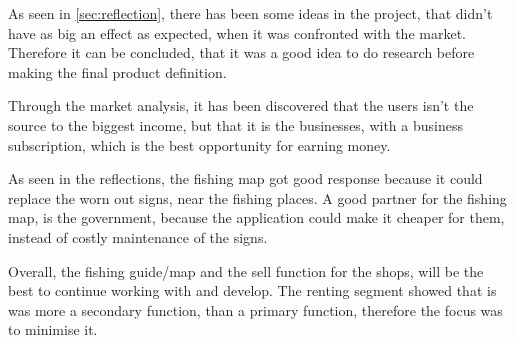 As seen in \autoref{sec:reflection}, there has been some ideas in the project, that didn't have as big an effect as expected, when it was confronted with the market. Therefore it can be concluded, that it was a good idea to do research before making the final product definition.   


Through the market analysis, it has been discovered that the users isn’t the source to the biggest income, but that it is the businesses, with a business subscription, which is the best opportunity for earning money. 


As seen in the reflections, the fishing map got good response because it could replace the worn out signs, near the fishing places. A good partner for the fishing map, is the government, because the application could make it cheaper for them, instead of costly maintenance of the signs. 


Overall, the fishing guide/map and the sell function for the shops, will be the best to continue working with and develop. The renting segment showed that is was more a secondary function, than a primary function, therefore the focus was to minimise it. 
